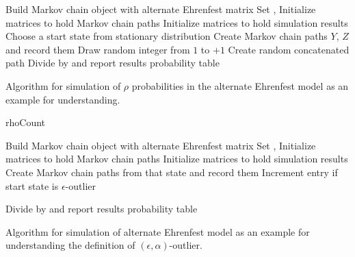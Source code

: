 \documentclass[12pt]{article}
\begin{document}
\begin{algorithm}[H]
    \DontPrintSemicolon {} 
      

     \BlankLine Build Markov chain object with alternate
    Ehrenfest matrix\; \BlankLine Set \pL, \nT\; Initialize matrices to
    hold Markov chain paths\; Initialize matrices \rhoN to hold
    simulation results\;  { Choose a start state
    from stationary distribution\; Create Markov chain paths \( Y \), \(
    Z \) and record them\; Draw random integer from \( 1 \) to \pL \( +1
    \)\; Create random concatenated path\;  }  Divide \rhoN by \nT
    and report results probability table\;

    \caption{Algorithm for simulation of \( \rho \) probabilities in the
    alternate Ehrenfest model as an example for understanding.}
\end{algorithm}

\begin{algorithm}[H]
    \DontPrintSemicolon {} 
      
    {rhoCount}

     \BlankLine Build Markov chain object with
    alternate Ehrenfest matrix\; \BlankLine Set \pL, \nT\; Initialize
    matrices to hold Markov chain paths\; Initialize matrices \rhoCount
    to hold simulation results\;  {  { Create Markov chain paths from that state and record them\;
    Increment \rhoCount entry if start state is \( \epsilon \)-outlier\;
    } }

    Divide \rhoCount by \nT and report results probability table\;
    \caption{Algorithm for simulation of alternate Ehrenfest model as an
    example for understanding the definition of \( (\epsilon, \alpha) \)-outlier.}
\end{algorithm}
\end{document}
